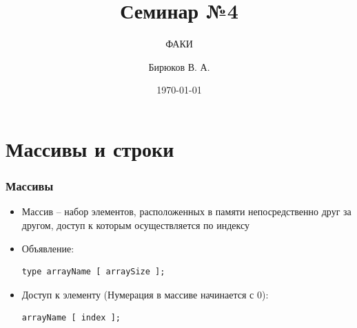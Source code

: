 \documentclass[12pt,pdf,hyperref={unicode}]{beamer}
\title{Семинар №4}
\subtitle{ФАКИ \the\year}
\author{Бирюков В. А.}
\date{\today}
\begin{document}
\lstset{language=C}

\begin{frame}
\titlepage
\end{frame} 



\section{Массивы и строки}

\begin{frame}[fragile]
\frametitle{Массивы} 
\begin{itemize}
\item Массив -- набор элементов, расположенных в памяти непосредственно друг за другом, доступ к которым осуществляется по индексу
\item Объявление:
\begin{lstlisting}
type arrayName [ arraySize ];
\end{lstlisting}
\item Доступ к элементу
(Нумерация в массиве начинается с 0):\\
\begin{lstlisting}
arrayName [ index ];
\end{lstlisting}
\end{itemize}
\end{frame}
\end{document}
